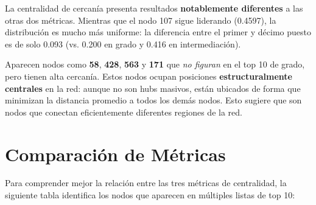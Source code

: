 \documentclass[12pt,a4paper,oneside,openany]{book}
\begin{document}
\begin{hallazgobox}
La centralidad de cercanía presenta resultados \textbf{notablemente diferentes}
a las otras dos métricas. Mientras que el nodo 107 sigue liderando (0.4597),
la distribución es mucho más uniforme: la diferencia entre el primer y décimo
puesto es de solo 0.093 (vs. 0.200 en grado y 0.416 en intermediación).

Aparecen nodos como \textbf{58}, \textbf{428}, \textbf{563} y \textbf{171} que
\textit{no figuran} en el top 10 de grado, pero tienen alta cercanía. Estos
nodos ocupan posiciones \textbf{estructuralmente centrales} en la red: aunque
no son hubs masivos, están ubicados de forma que minimizan la distancia promedio
a todos los demás nodos. Esto sugiere que son nodos que conectan eficientemente
diferentes regiones de la red.
\end{hallazgobox}

\section{Comparación de Métricas}

Para comprender mejor la relación entre las tres métricas de centralidad, la
siguiente tabla identifica los nodos que aparecen en múltiples listas de top 10:
\end{document}
